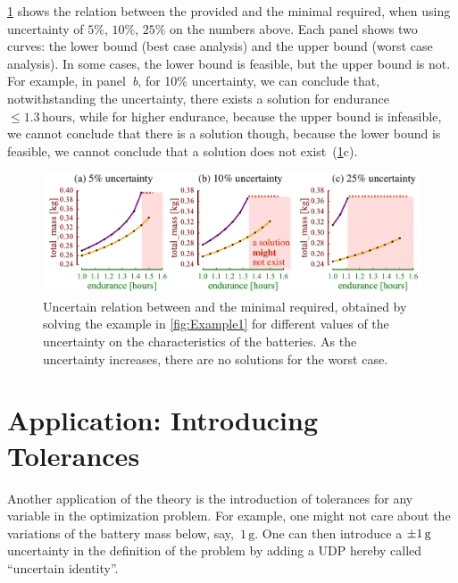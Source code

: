 \cref{fig:unc_battery_uncertain} shows the relation between
the provided  and the minimal  required,
when using uncertainty of $5\%$, $10\%$, $25\%$ on the numbers
above. Each panel shows two curves: the lower bound (best case analysis)
and the upper bound (worst case analysis). In some cases, the lower
bound is feasible, but the upper bound is not. For example, in panel~\emph{b},
for 10\% uncertainty, we can conclude that, notwithstanding the uncertainty,
there exists a solution for endurance~$\leq1.3\,\text{hours}$, while
for higher endurance, because the upper bound is infeasible, we cannot
conclude that there is a solution \textemdash{} though, because the
lower bound is feasible, we cannot conclude that a solution does not
exist~(\cref{fig:unc_battery_uncertain}c).
\begin{center}
    \begin{figure}[h]
        \begin{centering}
            \includegraphics[scale=0.33]{unc_battery_uncertain}
        \end{centering}
        \caption{Uncertain relation between 
        and the minimal  required, obtained by solving the
        example in \cref{fig:Example1} for different values of the uncertainty
        on the characteristics of the batteries. As the uncertainty increases,
            there are no solutions for the worst case.}
        \label{fig:unc_battery_uncertain}
    \end{figure}
\end{center}


\section{Application: Introducing Tolerances\label{sec:Application-tolerance}}

Another application of the theory is the introduction of tolerances
for any variable in the optimization problem. For example, one might
not care about the variations of the battery mass below, say,~$1\,\text{g}$.
One can then introduce a $\pm1\,\text{\ensuremath{\text{g}} }$ uncertainty
in the definition of the problem by adding a UDP hereby called ``uncertain
identity''.

